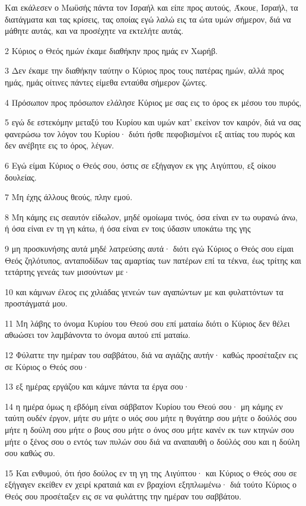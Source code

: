 \par Και εκάλεσεν ο Μωϋσής πάντα τον Ισραήλ και είπε προς αυτούς, Άκουε, Ισραήλ, τα διατάγματα και τας κρίσεις, τας οποίας εγώ λαλώ εις τα ώτα υμών σήμερον, διά να μάθητε αυτάς, και να προσέχητε να εκτελήτε αυτάς.
\par 2 Κύριος ο Θεός ημών έκαμε διαθήκην προς ημάς εν Χωρήβ.
\par 3 Δεν έκαμε την διαθήκην ταύτην ο Κύριος προς τους πατέρας ημών, αλλά προς ημάς, ημάς οίτινες πάντες είμεθα ενταύθα σήμερον ζώντες.
\par 4 Πρόσωπον προς πρόσωπον ελάλησε Κύριος με σας εις το όρος εκ μέσου του πυρός,
\par 5 εγώ δε εστεκόμην μεταξύ του Κυρίου και υμών κατ' εκείνον τον καιρόν, διά να σας φανερώσω τον λόγον του Κυρίου· διότι ήσθε πεφοβισμένοι εξ αιτίας του πυρός και δεν ανέβητε εις το όρος, λέγων.
\par 6 Εγώ είμαι Κύριος ο Θεός σου, όστις σε εξήγαγον εκ γης Αιγύπτου, εξ οίκου δουλείας.
\par 7 Μη έχης άλλους θεούς, πλην εμού.
\par 8 Μη κάμης εις σεαυτόν είδωλον, μηδέ ομοίωμα τινός, όσα είναι εν τω ουρανώ άνω, ή όσα είναι εν τη γη κάτω, ή όσα είναι εν τοις ύδασιν υποκάτω της γης
\par 9 μη προσκυνήσης αυτά μηδέ λατρεύσης αυτά· διότι εγώ Κύριος ο Θεός σου είμαι Θεός ζηλότυπος, ανταποδίδων τας αμαρτίας των πατέρων επί τα τέκνα, έως τρίτης και τετάρτης γενεάς των μισούντων με·
\par 10 και κάμνων έλεος εις χιλιάδας γενεών των αγαπώντων με και φυλαττόντων τα προστάγματά μου.
\par 11 Μη λάβης το όνομα Κυρίου του Θεού σου επί ματαίω διότι ο Κύριος δεν θέλει αθωώσει τον λαμβάνοντα το όνομα αυτού επί ματαίω.
\par 12 Φύλαττε την ημέραν του σαββάτου, διά να αγιάζης αυτήν· καθώς προσέταξεν εις σε Κύριος ο Θεός σου·
\par 13 εξ ημέρας εργάζου και κάμνε πάντα τα έργα σου·
\par 14 η ημέρα όμως η εβδόμη είναι σάββατον Κυρίου του Θεού σου· μη κάμης εν ταύτη ουδέν έργον, μήτε συ μήτε ο υιός σου μήτε η θυγάτηρ σου μήτε ο δούλός σου μήτε η δούλη σου μήτε ο βους σου μήτε ο όνος σου μήτε κανέν εκ των κτηνών σου μήτε ο ξένος σου ο εντός των πυλών σου διά να αναπαυθή ο δούλός σου και η δούλη σου καθώς συ.
\par 15 Και ενθυμού, ότι ήσο δούλος εν τη γη της Αιγύπτου· και Κύριος ο Θεός σου σε εξήγαγεν εκείθεν εν χειρί κραταιά και εν βραχίονι εξηπλωμένω· διά τούτο Κύριος ο Θεός σου προσέταξεν εις σε να φυλάττης την ημέραν του σαββάτου.
